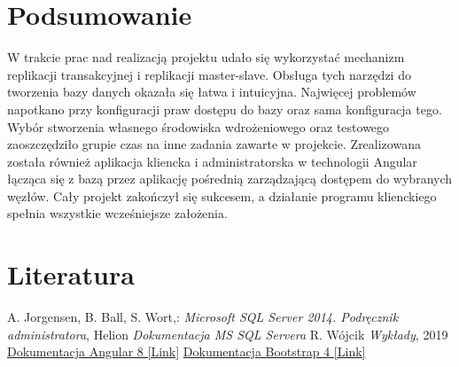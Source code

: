 \documentclass{article}
\begin{document}
\section{Podsumowanie}
W trakcie prac nad realizacją projektu udało się wykorzystać mechanizm replikacji
transakcyjnej i replikacji master-slave. Obsługa tych narzędzi do tworzenia bazy danych
okazała się łatwa i intuicyjna. Najwięcej problemów napotkano przy konfiguracji
praw dostępu do bazy oraz sama konfiguracja tego. Wybór stworzenia własnego środowiska wdrożeniowego oraz testowego zaoszczędziło grupie czas na inne zadania zawarte w projekcie.
Zrealizowana została również aplikacja kliencka i administratorska w technologii Angular łącząca się z bazą przez aplikację pośrednią zarządzającą dostępem do wybranych węzłów. Cały projekt zakończył się sukcesem, a działanie programu klienckiego spełnia wszystkie
wcześniejsze założenia.
\newpage
\section{Literatura}

\begin{thebibliography}{99}
 A. Jorgensen, B. Ball, S. Wort,:
\emph{Microsoft SQL Server 2014. Podręcznik administratora},
Helion
\emph{Dokumentacja MS SQL Servera}
 R. Wójcik
\emph{Wykłady},
2019
\href{https://angular.io/guide/forms}{Dokumentacja Angular 8 [Link]}
\href{https://getbootstrap.com}{Dokumentacja Bootstrap 4 [Link]}
\end{thebibliography}

 
\end{document}
